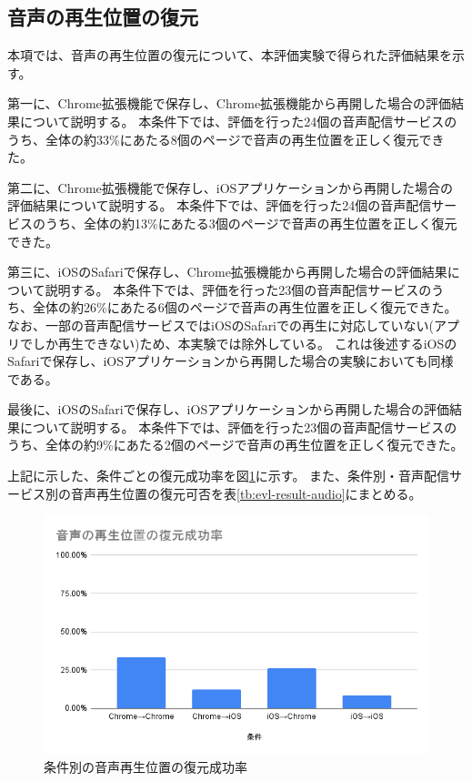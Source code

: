 
\subsection{音声の再生位置の復元}
本項では、音声の再生位置の復元について、本評価実験で得られた評価結果を示す。

第一に、Chrome拡張機能で保存し、Chrome拡張機能から再開した場合の評価結果について説明する。
本条件下では、評価を行った24個の音声配信サービスのうち、全体の約33\%にあたる8個のページで音声の再生位置を正しく復元できた。

第二に、Chrome拡張機能で保存し、iOSアプリケーションから再開した場合の評価結果について説明する。
本条件下では、評価を行った24個の音声配信サービスのうち、全体の約13\%にあたる3個のページで音声の再生位置を正しく復元できた。

第三に、iOSのSafariで保存し、Chrome拡張機能から再開した場合の評価結果について説明する。
本条件下では、評価を行った23個の音声配信サービスのうち、全体の約26\%にあたる6個のページで音声の再生位置を正しく復元できた。
なお、一部の音声配信サービスではiOSのSafariでの再生に対応していない(アプリでしか再生できない)ため、本実験では除外している。
これは後述するiOSのSafariで保存し、iOSアプリケーションから再開した場合の実験においても同様である。

最後に、iOSのSafariで保存し、iOSアプリケーションから再開した場合の評価結果について説明する。
本条件下では、評価を行った23個の音声配信サービスのうち、全体の約9\%にあたる2個のページで音声の再生位置を正しく復元できた。

上記に示した、条件ごとの復元成功率を図\ref{fig:success-rate-audio}に示す。
また、条件別・音声配信サービス別の音声再生位置の復元可否を表\ref{tb:evl-result-audio}にまとめる。

\begin{figure}[htbp]
  \caption{条件別の音声再生位置の復元成功率}
  \label{fig:success-rate-audio}
  \begin{center}
    \includegraphics[bb=0 0 600 371,width=15cm]{img/060_evaluation/result/audio/success-rate-audio.pdf}
  \end{center}
\end{figure}

